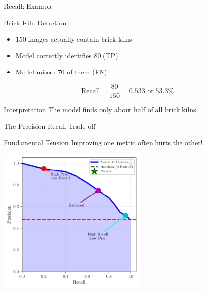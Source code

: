 \documentclass{beamer}
\begin{document}
\begin{frame}{Recall: Example}
\begin{examplebox}{Brick Kiln Detection}
\small
\begin{itemize}
    \item 150 images actually contain brick kilns
    \item Model correctly identifies 80 (TP)
    \item Model misses 70 of them (FN)
\end{itemize}

\vspace{0.2cm}

$$\text{Recall} = \frac{80}{150} = 0.533 \text{ or } 53.3\%$$
\end{examplebox}

\vspace{0.2cm}

\begin{keypointsbox}{Interpretation}
\small
The model finds only about half of all brick kilns
\end{keypointsbox}
\end{frame}

\begin{frame}{The Precision-Recall Trade-off}
\begin{keypointsbox}{Fundamental Tension}
\small
Improving one metric often hurts the other!
\end{keypointsbox}

\vspace{0.2cm}

\begin{center}
\includegraphics[width=0.55\textwidth]{pr-curve-diagram.pdf}
\end{center}
\end{frame}
\end{document}
